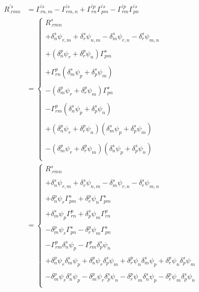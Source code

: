 \begin{align*}
R^{'s}_{.rmn} &= \Gamma^{'s}_{rn,m} - \Gamma^{'s}_{rm,n}+\Gamma^{'p}_{rn}\Gamma^{'s}_{pm}-\Gamma^{'p}_{rm}\Gamma^{'s}_{pn}\\
&=\left\{\begin{matrix}
R^{s}_{.rmn}\\\\
+\delta^s_n\psi_{r,m} +\delta^s_r\psi_{n,m}-\delta^s_m\psi_{r,n} -\delta^s_r\psi_{m,n}\\\\
+\left(\delta^p_n\psi_r +\delta^p_r\psi_n\right) \Gamma^{s}_{pm}\\\\
+\Gamma^{p}_{rn}\left(\delta^s_m\psi_p +\delta^s_p\psi_m\right)\\\\
-\left(\delta^p_m\psi_r +\delta^p_r\psi_m\right)\Gamma^{s}_{pn}\\\\
-\Gamma^{p}_{rm}\left(\delta^s_n\psi_p +\delta^s_p\psi_n\right)\\\\
+\left(\delta^p_n\psi_r +\delta^p_r\psi_n\right) \left(\delta^s_m\psi_p +\delta^s_p\psi_m\right)\\\\
-\left(\delta^p_m\psi_r +\delta^p_r\psi_m\right)\left(\delta^s_n\psi_p +\delta^s_p\psi_n\right)\\
\end{matrix}\right.\\
&=\left\{\begin{matrix}
R^{s}_{.rmn}\\\\
+\delta^s_n\psi_{r,m} +\delta^s_r\psi_{n,m}-\delta^s_m\psi_{r,n} -\delta^s_r\psi_{m,n}\\\\
+\delta^p_n\psi_r\Gamma^{s}_{pm} +\delta^p_r\psi_n \Gamma^{s}_{pm}\\\\
+\delta^s_m\psi_p\Gamma^{p}_{rn} +\delta^s_p\psi_m\Gamma^{p}_{rn}\\\\
-\delta^p_m\psi_r\Gamma^{s}_{pn} -\delta^p_r\psi_m\Gamma^{s}_{pn}\\\\
-\Gamma^{p}_{rm}\delta^s_n\psi_p -\Gamma^{p}_{rm}\delta^s_p\psi_n\\\\
+\delta^p_n\psi_r\delta^s_m\psi_p +\delta^p_n\psi_r\delta^s_p\psi_m +\delta^p_r\psi_n\delta^s_m\psi_p  +\delta^p_r\psi_n \delta^s_p\psi_m\\\\
-\delta^p_m\psi_r \delta^s_n\psi_p -\delta^p_m\psi_r \delta^s_p\psi_n-\delta^p_r\psi_m\delta^s_n\psi_p -\delta^p_r\psi_m\delta^s_p\psi_n\\
\end{matrix}\right.
\end{align*}
